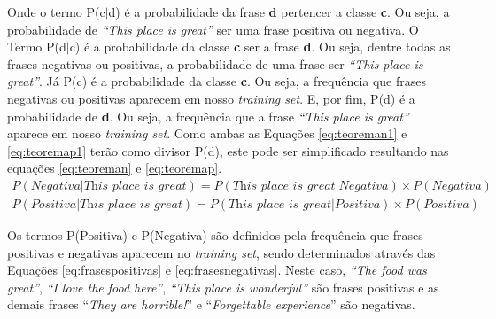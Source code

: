 Onde o termo P(c$\vert$d) é a probabilidade da frase \textbf{d} pertencer a
classe \textbf{c}. Ou seja, a probabilidade de \textit{``This place is great''} ser
  uma frase positiva ou negativa. O Termo P(d$\vert$c) é a probabilidade da
  classe \textbf{c} ser a frase \textbf{d}. Ou seja, dentre todas as frases
  negativas ou positivas, a probabilidade de uma frase ser \textit{``This place
  is great''}. Já P(c) é a probabilidade da classe \textbf{c}. Ou seja, a frequência que
  frases negativas ou positivas aparecem em nosso \textit{training
  set}. E, por fim, P(d) é a probabilidade de \textbf{d}. Ou seja, a frequência que
  a frase \textit{``This place is great''} aparece em nosso \textit{training
  set}. Como ambas as Equações \ref{eq:teoreman1} e \ref{eq:teoremap1} terão
  como divisor P(d), este pode ser simplificado resultando nas equações
  \ref{eq:teoreman} e \ref{eq:teoremap}.
\begin{equation}
\begin{gathered}
P(Negativa|\textit{This place is great})
=
P(\textit{This place is great}|Negativa) \times
P(Negativa)
\label{eq:teoreman}
\end{gathered}
\end{equation}
\begin{equation}
\begin{gathered}
P(Positiva|\textit{This place is great})
=
P(\textit{This place is great}|Positiva) \times
P(Positiva)
\label{eq:teoremap}
\end{gathered}
\end{equation}

Os termos P(Positiva) e P(Negativa) são definidos pela frequência que frases
positivas e negativas aparecem no \textit{training set}, sendo determinados
através das Equações \ref{eq:frasespositivas} e \ref{eq:frasesnegativas}. Neste
caso, \textit{``The food was great''}, \textit{``I love the food here''}, \textit{``This place is
wonderful''} são frases positivas e as demais frases ``\textit{They are horrible!}'' e
``\textit{Forgettable experience}'' são negativas.

